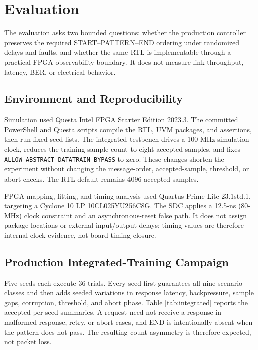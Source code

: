 \section{Evaluation}
\label{sec:evaluation}

The evaluation asks two bounded questions: whether the production controller
preserves the required START--PATTERN--END ordering under randomized delays and
faults, and whether the same RTL is implementable through a practical FPGA
observability boundary. It does not measure link throughput, latency, BER, or
electrical behavior.

\subsection{Environment and Reproducibility}

Simulation used Questa Intel FPGA Starter Edition 2023.3. The committed
PowerShell and Questa scripts compile the RTL, UVM packages, and assertions,
then run fixed seed lists. The integrated testbench drives a 100-MHz simulation
clock, reduces the training sample count to eight accepted samples, and fixes
\texttt{ALLOW\_ABSTRACT\_DATATRAIN\_BYPASS} to zero. These changes shorten the
experiment without changing the message-order, accepted-sample, threshold, or
abort checks. The RTL default remains 4096 accepted samples.

FPGA mapping, fitting, and timing analysis used Quartus Prime Lite
23.1std.1, targeting a Cyclone 10 LP 10CL025YU256C8G. The SDC applies a
12.5-ns (80-MHz) clock constraint and an asynchronous-reset false path. It does
not assign package locations or external input/output delays; timing values are
therefore internal-clock evidence, not board timing closure.

\subsection{Production Integrated-Training Campaign}

Five seeds each execute 36 trials. Every seed first guarantees all nine
scenario classes and then adds seeded variations in response latency,
backpressure, sample gaps, corruption, threshold, and abort phase. Table
\ref{tab:integrated} reports the accepted per-seed summaries. A request need not
receive a response in malformed-response, retry, or abort cases, and END is
intentionally absent when the pattern does not pass. The resulting count
asymmetry is therefore expected, not packet loss.

